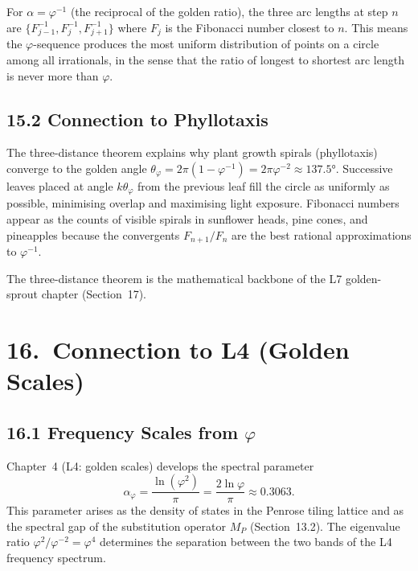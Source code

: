 For $\alpha = \varphi^{-1}$ (the reciprocal of the
golden ratio), the three arc lengths at step $n$
are $\{F_{j-1}^{-1}, F_j^{-1}, F_{j+1}^{-1}\}$
where $F_j$ is the Fibonacci number closest to $n$.
This means the $\varphi$-sequence produces the most
uniform distribution of points on a circle among
all irrationals, in the sense that the ratio of
longest to shortest arc length is never more
than $\varphi$.

\subsection{15.2 Connection to Phyllotaxis}
\label{subsec:gc-phyllotaxis}

The three-distance theorem explains why plant
growth spirals (phyllotaxis) converge to the
golden angle $\theta_\varphi = 2\pi(1-\varphi^{-1})
= 2\pi\varphi^{-2} \approx 137.5°$.
Successive leaves placed at angle $k\theta_\varphi$
from the previous leaf fill the circle as uniformly
as possible, minimising overlap and maximising
light exposure.
Fibonacci numbers appear as the counts of visible
spirals in sunflower heads, pine cones, and
pineapples because the convergents $F_{n+1}/F_n$
are the best rational approximations to $\varphi^{-1}$.

The three-distance theorem is the mathematical
backbone of the L7 golden-sprout chapter (Section~17).

\section{16.\ Connection to L4 (Golden Scales)}
\label{sec:gc-l4-link}

\subsection{16.1 Frequency Scales from $\varphi$}
\label{subsec:gc-l4-freq}

Chapter~4 (L4: golden scales) develops the spectral
parameter
\[
  \alpha_\varphi = \frac{\ln(\varphi^2)}{\pi}
    = \frac{2\ln\varphi}{\pi} \approx 0.3063.
\]
This parameter arises as the density of states in
the Penrose tiling lattice and as the spectral gap
of the substitution operator $M_P$ (Section~13.2).
The eigenvalue ratio $\varphi^2 / \varphi^{-2} = \varphi^4$
determines the separation between the two bands of
the L4 frequency spectrum.

